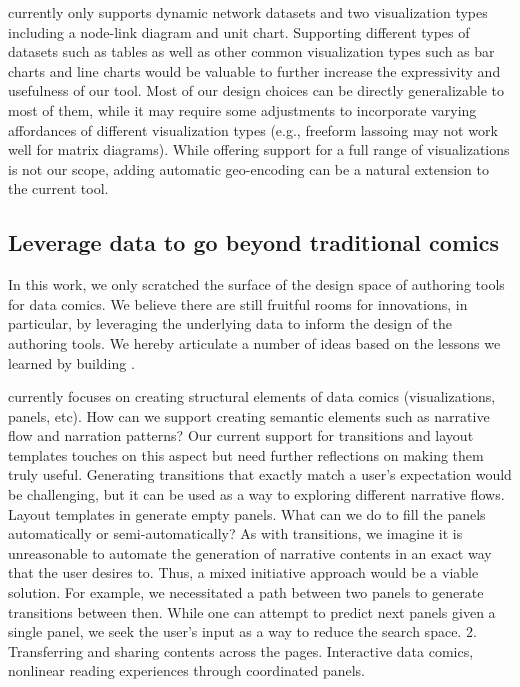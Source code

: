 \toolname{} currently only supports dynamic network datasets and two visualization types including a node-link diagram and unit chart. Supporting different types of datasets such as tables as well as other common visualization types such as bar charts and line charts would be valuable to further increase the expressivity and usefulness of our tool. Most of our design choices can be directly generalizable to most of them, while it may require some adjustments to incorporate varying affordances of different visualization types (e.g., freeform lassoing may not work well for matrix diagrams). While offering support for a full range of visualizations is not our scope, adding automatic geo-encoding can be a natural extension to the current tool.





\subsection{Leverage data to go beyond traditional comics}

In this work, we only scratched the surface of the design space of authoring tools for data comics. We believe there are still fruitful rooms for innovations, in particular, by leveraging the underlying data to inform the design of the authoring tools. We hereby articulate a number of ideas based on the lessons we learned by building \toolname{}. 

\toolname{} currently focuses on creating structural elements of data comics (visualizations, panels, etc). How can we support creating semantic elements such as narrative flow and narration patterns? Our current support for transitions and layout templates touches on this aspect but need further reflections on making them truly useful. Generating transitions that exactly match a user's expectation would be challenging, but it can be used as a way to exploring different narrative flows. Layout templates in \toolname{} generate empty panels. What can we do to fill the panels automatically or semi-automatically? As with transitions, we imagine it is unreasonable to automate the generation of narrative contents in an exact way that the user desires to. Thus, a mixed initiative approach would be a viable solution. For example, we necessitated a path between two panels to generate transitions between then. While one can attempt to predict next panels given a single panel, we seek the user's input as a way to reduce the search space.
2. Transferring and sharing contents across the pages. Interactive data comics, nonlinear reading experiences through coordinated panels.

